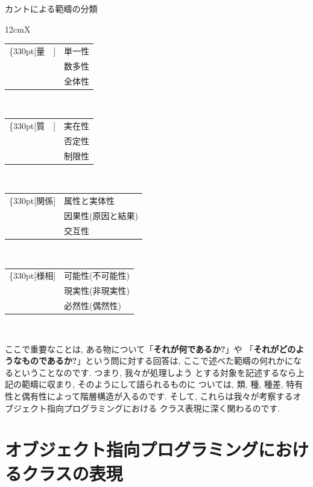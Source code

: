 \begin{itembox}[c]{カントによる範疇の分類}
{\footnotesize
\begin{tabularx}{12cm}{X}
\begin{tabular}[t]{rl}
\ldelim\{{3}{30pt}[量　]&
単一性\\
&数多性\\
&全体性\\
\end{tabular}
\\
\begin{tabular}[t]{rl}
\ldelim\{{3}{30pt}[質　]&
実在性\\
&否定性\\
&制限性\\
\end{tabular}
\\
\begin{tabular}[t]{rl}
\ldelim\{{3}{30pt}[関係]&
属性と実体性\\
&因果性(原因と結果)\\
&交互性\\
\end{tabular}
\\
\begin{tabular}[t]{rl}
\ldelim\{{3}{30pt}[様相]&
可能性(不可能性)\\
&現実性(非現実性)\\
&必然性(偶然性)\\
\end{tabular}
\\
\end{tabularx}
}
\end{itembox}


ここで重要なことは, ある物について「\textbf{それが何であるか?}」や
「\textbf{それがどのようなものであるか?}」という問に対する回答は,
 ここで述べた範疇の何れかになるということなのです. つまり, 我々が処理しよう
とする対象を記述するなら上記の範疇に収まり, そのようにして語られるものに
ついては, 類, 種, 種差, 特有性と偶有性によって階層構造が入るのです.
 そして, これらは我々が考察するオブジェクト指向プログラミングにおける
クラス表現に深く関わるのです.

\section{オブジェクト指向プログラミングにおけるクラスの表現}


